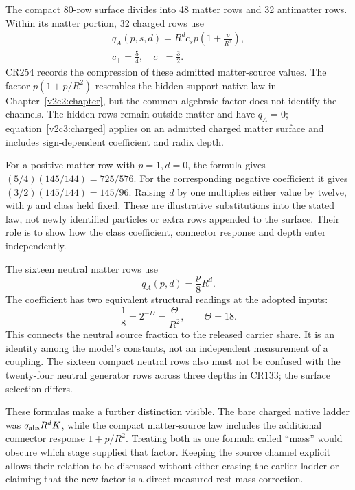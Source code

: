 The compact 80-row surface divides into 48 matter rows and 32 antimatter rows. Within its matter portion, 32 charged rows use
\begin{equation}
\begin{gathered}
q_A(p,s,d)=R^d c_s p\left(1+\frac{p}{R^2}\right),\\
c_+=\frac54,\quad c_-=\frac32.
\end{gathered}
\label{v2c3:charged}
\end{equation}
CR254 records the compression of these admitted matter-source values. The factor $p(1+p/R^2)$ resembles the hidden-support native law in Chapter~\ref{v2c2:chapter}, but the common algebraic factor does not identify the channels. The hidden rows remain outside matter and have $q_A=0$; equation~\eqref{v2c3:charged} applies on an admitted charged matter surface and includes sign-dependent coefficient and radix depth.

For a positive matter row with $p=1,d=0$, the formula gives $(5/4)(145/144)=725/576$. For the corresponding negative coefficient it gives $(3/2)(145/144)=145/96$. Raising $d$ by one multiplies either value by twelve, with $p$ and class held fixed. These are illustrative substitutions into the stated law, not newly identified particles or extra rows appended to the surface. Their role is to show how the class coefficient, connector response and depth enter independently.

The sixteen neutral matter rows use
\begin{equation}
q_A(p,d)=\frac{p}{8}R^d.
\label{v2c3:neutral}
\end{equation}
The coefficient has two equivalent structural readings at the adopted inputs:
\begin{equation}
\frac18=2^{-D}=\frac{\Theta}{R^2},\qquad \Theta=18.
\end{equation}
This connects the neutral source fraction to the released carrier share. It is an identity among the model's constants, not an independent measurement of a coupling. The sixteen compact neutral rows also must not be confused with the twenty-four neutral generator rows across three depths in CR133; the surface selection differs.

These formulas make a further distinction visible. The bare charged native ladder was $q_{\rm abs}R^dK$, while the compact matter-source law includes the additional connector response $1+p/R^2$. Treating both as one formula called ``mass'' would obscure which stage supplied that factor. Keeping the source channel explicit allows their relation to be discussed without either erasing the earlier ladder or claiming that the new factor is a direct measured rest-mass correction.

